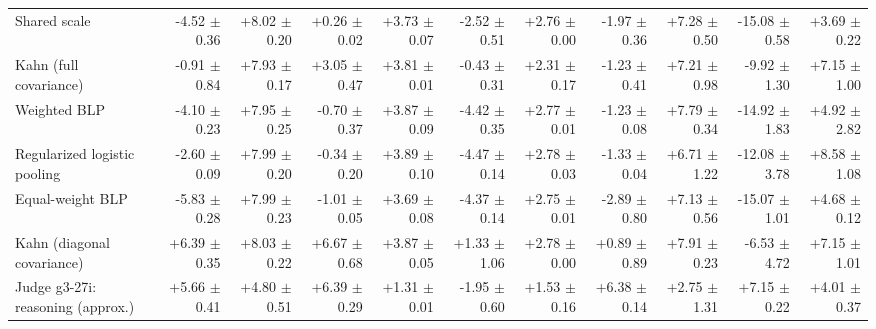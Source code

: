 \begin{tabular}{lrrrrrrrrrr}
Shared scale & -4.52 {\scriptsize $\pm$ 0.36} & +8.02 {\scriptsize $\pm$ 0.20} & +0.26 {\scriptsize $\pm$ 0.02} & +3.73 {\scriptsize $\pm$ 0.07} & -2.52 {\scriptsize $\pm$ 0.51} & +2.76 {\scriptsize $\pm$ 0.00} & -1.97 {\scriptsize $\pm$ 0.36} & +7.28 {\scriptsize $\pm$ 0.50} & -15.08 {\scriptsize $\pm$ 0.58} & +3.69 {\scriptsize $\pm$ 0.22} \\
Kahn (full covariance) & -0.91 {\scriptsize $\pm$ 0.84} & +7.93 {\scriptsize $\pm$ 0.17} & +3.05 {\scriptsize $\pm$ 0.47} & +3.81 {\scriptsize $\pm$ 0.01} & -0.43 {\scriptsize $\pm$ 0.31} & +2.31 {\scriptsize $\pm$ 0.17} & -1.23 {\scriptsize $\pm$ 0.41} & +7.21 {\scriptsize $\pm$ 0.98} & -9.92 {\scriptsize $\pm$ 1.30} & +7.15 {\scriptsize $\pm$ 1.00} \\
Weighted BLP & -4.10 {\scriptsize $\pm$ 0.23} & +7.95 {\scriptsize $\pm$ 0.25} & -0.70 {\scriptsize $\pm$ 0.37} & +3.87 {\scriptsize $\pm$ 0.09} & -4.42 {\scriptsize $\pm$ 0.35} & +2.77 {\scriptsize $\pm$ 0.01} & -1.23 {\scriptsize $\pm$ 0.08} & +7.79 {\scriptsize $\pm$ 0.34} & -14.92 {\scriptsize $\pm$ 1.83} & +4.92 {\scriptsize $\pm$ 2.82} \\
Regularized logistic pooling & -2.60 {\scriptsize $\pm$ 0.09} & +7.99 {\scriptsize $\pm$ 0.20} & -0.34 {\scriptsize $\pm$ 0.20} & +3.89 {\scriptsize $\pm$ 0.10} & -4.47 {\scriptsize $\pm$ 0.14} & +2.78 {\scriptsize $\pm$ 0.03} & -1.33 {\scriptsize $\pm$ 0.04} & +6.71 {\scriptsize $\pm$ 1.22} & -12.08 {\scriptsize $\pm$ 3.78} & +8.58 {\scriptsize $\pm$ 1.08} \\
Equal-weight BLP & -5.83 {\scriptsize $\pm$ 0.28} & +7.99 {\scriptsize $\pm$ 0.23} & -1.01 {\scriptsize $\pm$ 0.05} & +3.69 {\scriptsize $\pm$ 0.08} & -4.37 {\scriptsize $\pm$ 0.14} & +2.75 {\scriptsize $\pm$ 0.01} & -2.89 {\scriptsize $\pm$ 0.80} & +7.13 {\scriptsize $\pm$ 0.56} & -15.07 {\scriptsize $\pm$ 1.01} & +4.68 {\scriptsize $\pm$ 0.12} \\
Kahn (diagonal covariance) & +6.39 {\scriptsize $\pm$ 0.35} & +8.03 {\scriptsize $\pm$ 0.22} & +6.67 {\scriptsize $\pm$ 0.68} & +3.87 {\scriptsize $\pm$ 0.05} & +1.33 {\scriptsize $\pm$ 1.06} & +2.78 {\scriptsize $\pm$ 0.00} & +0.89 {\scriptsize $\pm$ 0.89} & +7.91 {\scriptsize $\pm$ 0.23} & -6.53 {\scriptsize $\pm$ 4.72} & +7.15 {\scriptsize $\pm$ 1.01} \\
Judge g3-27i: reasoning (approx.) & +5.66 {\scriptsize $\pm$ 0.41} & +4.80 {\scriptsize $\pm$ 0.51} & +6.39 {\scriptsize $\pm$ 0.29} & +1.31 {\scriptsize $\pm$ 0.01} & -1.95 {\scriptsize $\pm$ 0.60} & +1.53 {\scriptsize $\pm$ 0.16} & +6.38 {\scriptsize $\pm$ 0.14} & +2.75 {\scriptsize $\pm$ 1.31} & +7.15 {\scriptsize $\pm$ 0.22} & +4.01 {\scriptsize $\pm$ 0.37} \\

\end{tabular}
